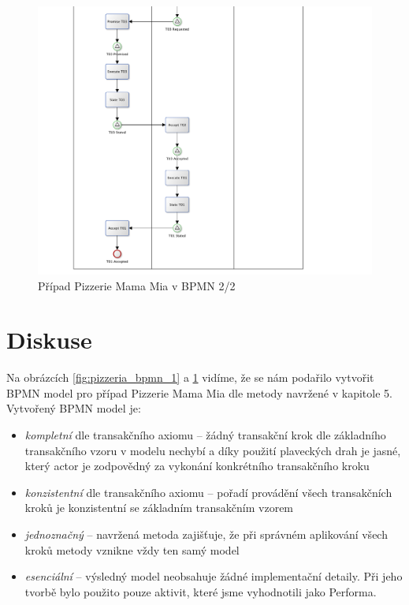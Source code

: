 \documentclass[]{article}
\begin{document}
\begin{center}
\begin{figure}[H]
\centerline{\includegraphics[width=1.28\textwidth,height=\textheight,keepaspectratio]{obrazky/pizzeria-bpmn-2}}
\caption{Případ Pizzerie Mama Mia v BPMN 2/2}
\label{fig:pizzeria_bpmn_2}
\end{figure}
\end{center}

\section{Diskuse}
Na obrázcích \ref{fig:pizzeria_bpmn_1} a \ref{fig:pizzeria_bpmn_2} vidíme, že se nám podařilo vytvořit BPMN model pro případ Pizzerie Mama Mia dle metody navržené v kapitole 5. Vytvořený BPMN model je:

\begin{itemize}
\item \textit{kompletní} dle transakčního axiomu – žádný transakční krok dle základního transakčního vzoru v modelu nechybí a díky použití plaveckých drah je jasné, který actor je zodpovědný za vykonání konkrétního transakčního kroku
\item \textit{konzistentní} dle transakčního axiomu – pořadí provádění všech transakčních kroků je konzistentní se základním transakčním vzorem
\item \textit{jednoznačný} – navržená metoda zajišťuje, že při správném aplikování všech kroků metody vznikne vždy ten samý model
\item \textit{esenciální} – výsledný model neobsahuje žádné implementační detaily. Při jeho tvorbě bylo použito pouze aktivit, které jsme vyhodnotili jako Performa.
\end{itemize}
\end{document}
